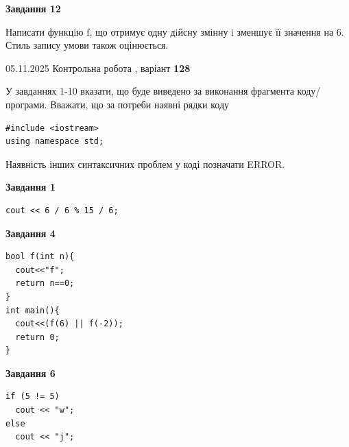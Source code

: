 \documentclass[12pt, ukrainian]{article}
\begin{document}
{\begin {large}
\begin{minipage}[t]{11.0cm}
\begin{center}
\textbf{Завдання 12}
\end{center}

Написати функцiю f, що отримує одну дiйсну змінну i зменшує її значення на 6. Стиль запису умови також оцінюється.\par

\end{minipage}

\end {large}}
\newpage

{\Large{05.11.2025 Контрольна робота , варіант  \No \textbf { 128 }\par}}
{
\begin {large}
У завданнях 1-10 вказати, що буде виведено за виконання фрагмента коду/про\-гра\-ми.
Вважати, що за потреби наявні рядки коду
\begin{verbatim}
#include <iostream>
using namespace std;
\end{verbatim}
Наявність інших синтаксичних проблем у коді позначати ERROR.

\begin{minipage}[t]{7.0cm}

\begin{center}
\textbf{Завдання 1}
\end{center}
\vspace{-8mm}

\begin{verbatim}
cout << 6 / 6 % 15 / 6;
\end{verbatim}



\begin{center}
\textbf{Завдання 4}
\end{center}
\vspace{-8mm}

\begin{verbatim}
bool f(int n){
  cout<<"f";
  return n==0;
}
int main(){
  cout<<(f(6) || f(-2));
  return 0;
}
\end{verbatim}



\begin{center}
\textbf{Завдання 6}
\end{center}
\vspace{-8mm}

\begin{verbatim}
if (5 != 5)
  cout << "w";
else
  cout << "j";
\end{verbatim}




\end{minipage}
\end{large}}
\end{document}
